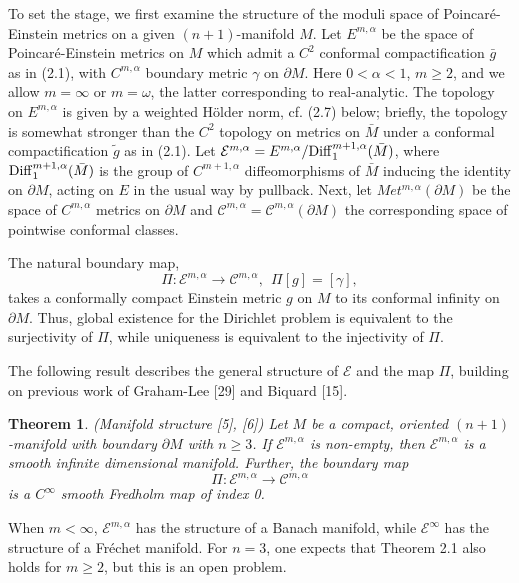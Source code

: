 \documentclass[11pt,amsfonts]{amsart}
\newtheorem{theorem}{Theorem}[section]
\begin{document}
\medskip

 To set the stage, we first examine the structure of the moduli space 
of Poincar\'e-Einstein metrics on a given $(n+1)$-manifold $M$. Let 
$E^{m,\alpha}$ be the space of Poincar\'e-Einstein metrics on $M$ which 
admit a $C^{2}$ conformal compactification $\bar g$ as in (2.1), 
with $C^{m,\alpha}$ boundary metric $\gamma$ on $\partial M$. Here $0 
< \alpha < 1$, $m \geq 2$, and we allow $m = \infty$ or $m = \omega$, 
the latter corresponding to real-analytic. The topology on $E^{m,\alpha}$ 
is given by a weighted H\"older norm, cf. (2.7) below; briefly, the topology 
is somewhat stronger than the $C^{2}$ topology on metrics on $\bar M$ under a 
conformal compactification $\widetilde g$ as in (2.1). Let ${\mathcal E}^{m,\alpha} = 
E^{m,\alpha}/{\rm Diff}_{1}^{m+1,\alpha}(\bar M)$, where 
${\rm Diff}_{1}^{m+1,\alpha}(\bar M)$ is the group of $C^{m+1,\alpha}$ 
diffeomorphisms of $\bar M$ inducing the identity on $\partial M$, acting 
on $E$ in the usual way by pullback. Next, let $Met^{m,\alpha}(\partial M)$ 
be the space of $C^{m,\alpha}$ metrics on $\partial M$ and ${\mathcal C}^{m,\alpha} 
= {\mathcal C}^{m,\alpha}(\partial M)$ the corresponding space of 
pointwise conformal classes. 

 The natural boundary map, 
\begin{equation} \label{e2.4}
\Pi : {\mathcal E}^{m,\alpha} \rightarrow  {\mathcal C}^{m,\alpha}, \ \ 
\Pi [g] = [\gamma], 
\end{equation}
takes a conformally compact Einstein metric $g$ on $M$ to its conformal 
infinity on $\partial M$. Thus, global existence for the Dirichlet 
problem is equivalent to the surjectivity of $\Pi$, while uniqueness 
is equivalent to the injectivity of $\Pi$. 

 The following result describes the general structure of ${\mathcal E}$ 
and the map $\Pi$, building on previous work of Graham-Lee [29] and 
Biquard [15].
\begin{theorem} \label{t 2.1.}
{\rm  (Manifold structure [5], [6])} Let $M$ be a compact, oriented $(n+1)$-manifold 
with boundary $\partial M$ with $n \geq 3$. If ${\mathcal E}^{m,\alpha}$ is non-empty, 
then ${\mathcal E}^{m,\alpha}$ is a smooth infinite dimensional manifold. Further, 
the boundary map 
$$\Pi : {\mathcal E}^{m,\alpha} \rightarrow  {\mathcal C}^{m,\alpha} $$
is a $C^{\infty}$ smooth Fredholm map of index 0.
\end{theorem}

  When $ m < \infty$, ${\mathcal E}^{m,\alpha}$ has the structure of a 
Banach manifold, while ${\mathcal E}^{\infty}$ has the structure of a 
Fr\'echet manifold. For $n = 3$, one expects that Theorem 2.1 also holds for 
$m \geq 2$, but this is an open problem. 
\end{document}
